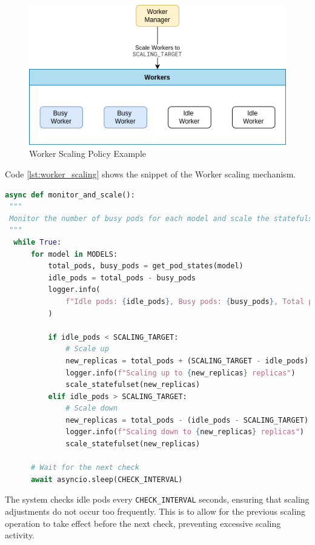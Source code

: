 \begin{figure}[H]
  \centering
  \includegraphics[width=.8\textwidth]{figures/worker_scaling_policy.drawio.png}
  \caption{Worker Scaling Policy Example}
  \label{fig:worker_scaling_policy}
\end{figure}

Code \ref{lst:worker_scaling} shows the snippet of the Worker scaling mechanism.

\begin{lstlisting}[language=python, caption={Worker Scaling Policy}, label={lst:worker_scaling}]
async def monitor_and_scale():
 """
 Monitor the number of busy pods for each model and scale the statefulset up or down based on the number of idle pods.
 """
  while True:
      for model in MODELS:
          total_pods, busy_pods = get_pod_states(model)
          idle_pods = total_pods - busy_pods
          logger.info(
              f"Idle pods: {idle_pods}, Busy pods: {busy_pods}, Total pods: {total_pods}"
          )

          if idle_pods < SCALING_TARGET:
              # Scale up
              new_replicas = total_pods + (SCALING_TARGET - idle_pods)
              logger.info(f"Scaling up to {new_replicas} replicas")
              scale_statefulset(new_replicas)
          elif idle_pods > SCALING_TARGET:
              # Scale down
              new_replicas = total_pods - (idle_pods - SCALING_TARGET)
              logger.info(f"Scaling down to {new_replicas} replicas")
              scale_statefulset(new_replicas)

      # Wait for the next check
      await asyncio.sleep(CHECK_INTERVAL)
\end{lstlisting}

The system checks idle pods every \texttt{CHECK\_INTERVAL} seconds, ensuring that scaling adjustments do not occur too frequently. This is to allow for the previous scaling operation to take effect before the next check, preventing excessive scaling activity.

